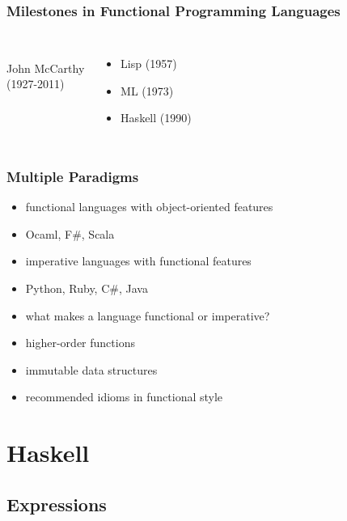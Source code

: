 \documentclass[dvipsnames]{beamer}
\theoremstyle{plain}
\begin{document}
\begin{frame}
  \frametitle{Milestones in Functional Programming Languages}

  \begin{columns}
    \begin{center}
      \\
      John McCarthy\\
      (1927-2011)
    \end{center}

    \begin{itemize}
      \item Lisp (1957)
      \item ML (1973)
      \item Haskell (1990)
    \end{itemize}
  \end{columns}
\end{frame}

\begin{frame}
  \frametitle{Multiple Paradigms}

  \begin{itemize}
    \item functional languages with object-oriented features
    \item Ocaml, F\#, Scala

    \medskip
    \item imperative languages with functional features
    \item Python, Ruby, C\#, Java

    \pause
    \bigskip
    \item what makes a language functional or imperative?
    \smallskip
    \item higher-order functions
    \item immutable data structures
    \item recommended idioms in functional style
  \end{itemize}
\end{frame}

\section{Haskell}

\lstset{language=Haskell}

\subsection{Expressions}
\end{document}
